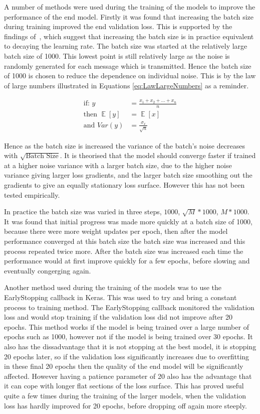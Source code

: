 \documentclass[12pt,onecolumn,letterpaper]{article}
\begin{document}
A number of methods were used during the training of the models to improve the performance of the end model. Firstly it was found that increasing the batch size during training improved the end validation loss. This is supported by the findings of~\cite{IncBatchSize}, which suggest that increasing the batch size is in practice equivalent to decaying the learning rate. The batch size was started at the relatively large batch size of 1000. This lowest point is still relatively large as the noise is randomly generated for each message which is transmitted. Hence the batch size of 1000 is chosen to reduce the dependence on individual noise. This is by the law of large numbers illustrated in Equations \ref{eq:LawLargeNumbers} as a reminder.

\begin{align}
   \mbox{if: } y &= \frac{x_1 + x_2 +\dots + x_n}{n} \nonumber\\
   \mbox{then }  \mathop{\mathbb{E}}[y] &= \mathop{\mathbb{E}}[x] \nonumber\\
   \mbox{and } Var(y) &= \frac{\sigma_x}{\sqrt{n}}
   \label{eq:LawLargeNumbers}
\end{align}

Hence as the batch size is increased the variance of the batch's noise decreases with $\sqrt{\mbox{Batch Size}}$. It is theorised that the model should converge faster if trained at a higher noise variance with a larger batch size, due to the higher noise variance giving larger loss gradients, and the larger batch size smoothing out the gradients to give an equally stationary loss surface. However this has not been tested empirically.

In practice the batch size was varied in three steps, $1000$, $\sqrt{M}*1000$, $M*1000$. It was found that initial progress was made more quickly at a batch size of 1000, because there were more weight updates per epoch, then after the model performance converged at this batch size the batch size was increased and this process repeated twice more. After the batch size was increased each time the performance would at first improve quickly for a few epochs, before slowing and eventually congerging again.

Another method used during the training of the models was to use the EarlyStopping callback in Keras. This was used to try and bring a constant process to training method. The EarlyStopping callback monitored the validation loss and would stop training if the validation loss did not improve after 20 epochs. This method works if the model is being trained over a large number of epochs such as 1000, however not if the model is being trained over 30 epochs. It also has the dissadvantage that it is not stopping at the best model, it is stopping 20 epochs later, so if the validation loss significantly increases due to overfitting in these final 20 epochs then the quality of the end model will be significantly affected. However having a patience parameter of 20 also has the advantage that it can cope with longer flat sections of the loss surface. This has proved useful quite a few times during the training of the larger models, when the validation loss has hardly improved for 20 epochs, before dropping off again more steeply. 
\end{document}
